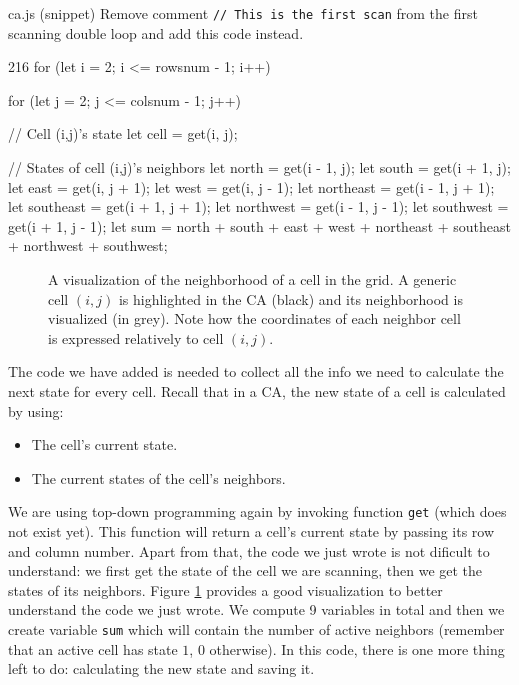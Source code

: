\begin{programcode}{ca.js (snippet)}
Remove comment \texttt{// This is the first scan} from the first scanning double loop and add this
code instead.
\begin{codeh1}{2}{16}
for (let i = 2; i <= rowsnum - 1; i++) {
  for (let j = 2; j <= colsnum - 1; j++) {
    // Cell (i,j)'s state
    let cell = get(i, j);

    // States of cell (i,j)'s neighbors
    let north = get(i - 1, j);
    let south = get(i + 1, j);
    let east = get(i, j + 1);
    let west = get(i, j - 1);
    let northeast = get(i - 1, j + 1);
    let southeast = get(i + 1, j + 1);
    let northwest = get(i - 1, j - 1);
    let southwest = get(i + 1, j - 1);
    let sum = north + south + east + west + northeast + southeast + northwest + southwest;
  }
}
\end{codeh1}
\end{programcode}

%
\begin{figure}[b]
\sidecaption

%
%
\caption{A visualization of the neighborhood of a cell in the grid.
A generic cell $(i,j)$ is highlighted in the CA (black)
and its neighborhood is visualized (in grey).
Note how the coordinates of each neighbor cell is expressed relatively
to cell $(i,j)$.}
\label{fig:cellneigh}
\end{figure}
%

The code we have added is needed to collect all the info we need to calculate the next state for every cell.
Recall that in a CA, the new state of a cell is calculated by using:

\begin{itemize}
\item The cell's current state.
\item The current states of the cell's neighbors.
\end{itemize}

We are using top-down programming again by invoking function \texttt{get} (which does not exist yet). This function
will return a cell's current state by passing its row and column number. Apart from that, the code we
just wrote is not dificult to understand: we first get the state of the cell we are scanning, then we get the states
of its neighbors. Figure \ref{fig:cellneigh} provides a good visualization to better understand the code we just
wrote.
We compute 9 variables in total and then we create variable \texttt{sum} which will
contain the number of active neighbors (remember that an active cell has state $1$, $0$ otherwise). In this
code, there is one more thing left to do: calculating the new state and saving it.

